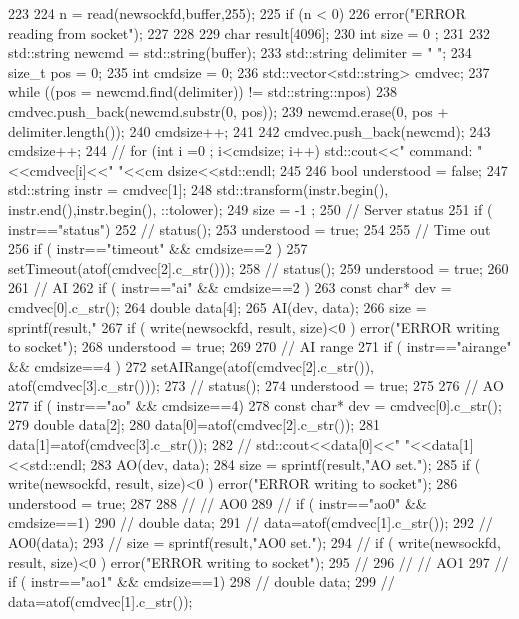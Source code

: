 \begin{DoxyCode}
223                       {
224   n = read(newsockfd,buffer,255);
225   if (n < 0) {
226     error("ERROR reading from socket");
227   }
228  
229   char   result[4096];
230   int    size = 0 ;
231   
232   std::string newcmd = std::string(buffer);
233   std::string delimiter = " ";
234   size_t pos = 0;
235   int cmdsize = 0;
236   std::vector<std::string> cmdvec;
237   while ((pos = newcmd.find(delimiter)) != std::string::npos) {
238     cmdvec.push_back(newcmd.substr(0, pos));
239     newcmd.erase(0, pos + delimiter.length());
240     cmdsize++;
241   }
242   cmdvec.push_back(newcmd);
243   cmdsize++;
244   //  for (int i =0 ; i<cmdsize; i++) std::cout<<" command: "<<cmdvec[i]<<" "<<cm
      dsize<<std::endl;
245   
246   bool understood = false;
247   std::string instr = cmdvec[1];
248   std::transform(instr.begin(), instr.end(),instr.begin(), ::tolower);
249   size = -1 ; 
250   // Server status
251   if ( instr=="status"){
252     //    status();
253     understood = true;
254   }
255   // Time out
256   if ( instr=="timeout" && cmdsize==2 ){
257     setTimeout(atof(cmdvec[2].c_str()));
258     //    status();
259     understood = true;
260   }
261   // AI
262   if ( instr=="ai" && cmdsize==2 ){
263     const char* dev = cmdvec[0].c_str();
264     double data[4];
265     AI(dev, data);
266     size = sprintf(result,"%
267     if ( write(newsockfd, result, size)<0 ) error("ERROR writing to socket");
268     understood = true; 
269   }
270   // AI range 
271   if ( instr=="airange" && cmdsize==4 ){
272     setAIRange(atof(cmdvec[2].c_str()), atof(cmdvec[3].c_str()));
273     //    status();
274     understood = true;
275   }
276   // AO
277   if ( instr=="ao" && cmdsize==4){
278     const char* dev = cmdvec[0].c_str();
279     double data[2];
280     data[0]=atof(cmdvec[2].c_str());
281     data[1]=atof(cmdvec[3].c_str());
282     //    std::cout<<data[0]<<" "<<data[1]<<std::endl;
283     AO(dev, data);
284     size = sprintf(result,"AO set.");
285     if ( write(newsockfd, result, size)<0 ) error("ERROR writing to socket");
286     understood = true;
287   }
288   // // AO0
289   // if ( instr=="ao0" && cmdsize==1){
290   //   double data;
291   //   data=atof(cmdvec[1].c_str());
292   //   AO0(data);
293   //   size = sprintf(result,"AO0 set.");
294   //   if ( write(newsockfd, result, size)<0 ) error("ERROR writing to socket");
295   // }
296   // // AO1
297   // if ( instr=="ao1" && cmdsize==1){
298   //   double data;
299   //   data=atof(cmdvec[1].c_str());
}}
\end{DoxyCode}
